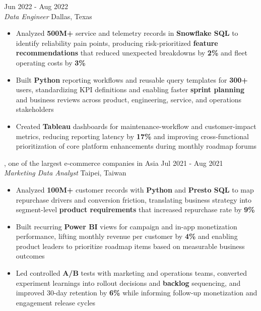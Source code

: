 \documentclass[11pt,letterpaper]{article}
\begin{document}
\vspace{4pt}
 \hfill Jun 2022 - Aug 2022\\[-1pt]
\textit{Data Engineer} \hfill Dallas, Texas
\begin{itemize}[leftmargin=1.5em, rightmargin=0pt, itemsep=-1pt, topsep=-1pt, parsep=0pt]
  \item \justifying Analyzed \textbf{500M+} service and telemetry records in \textbf{Snowflake SQL} to identify reliability pain points, producing risk-prioritized \textbf{feature recommendations} that reduced unexpected breakdowns by \textbf{2\%} and fleet operating costs by \textbf{3\%}
  \item \justifying Built \textbf{Python} reporting workflows and reusable query templates for \textbf{300+} users, standardizing KPI definitions and enabling faster \textbf{sprint planning} and business reviews across product, engineering, service, and operations stakeholders
  \item \justifying Created \textbf{Tableau} dashboards for maintenance-workflow and customer-impact metrics, reducing reporting latency by \textbf{17\%} and improving cross-functional prioritization of core platform enhancements during monthly roadmap forums
\end{itemize}

\vspace{4pt}
, one of the largest e-commerce companies in Asia \hfill Jul 2021 - Aug 2021\\[-1pt]
\textit{Marketing Data Analyst} \hfill Taipei, Taiwan
\begin{itemize}[leftmargin=1.5em, rightmargin=0pt, itemsep=-1pt, topsep=-1pt, parsep=0pt]
  \item \justifying Analyzed \textbf{100M+} customer records with \textbf{Python} and \textbf{Presto SQL} to map repurchase drivers and conversion friction, translating business strategy into segment-level \textbf{product requirements} that increased repurchase rate by \textbf{9\%}
  \item \justifying Built recurring \textbf{Power BI} views for campaign and in-app monetization performance, lifting monthly revenue per customer by \textbf{4\%} and enabling product leaders to prioritize roadmap items based on measurable business outcomes
  \item \justifying Led controlled \textbf{A/B} tests with marketing and operations teams, converted experiment learnings into rollout decisions and \textbf{backlog} sequencing, and improved 30-day retention by \textbf{6\%} while informing follow-up monetization and engagement release cycles
\end{itemize}
\end{document}
